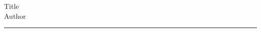 \documentclass[answers]{exam}
\begin{document}
	\begin{center}
	      \Large Title \\
	      \large Author
	\end{center}
	\hrule

	\begin{questions}
		\question 
	\end{questions}
\end{document}
